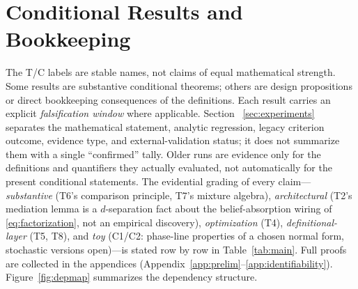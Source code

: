 \section{Conditional Results and Bookkeeping}\label{sec:theorems}

The T/C labels are stable names, not claims of equal mathematical strength.
Some results are substantive conditional theorems; others are design
propositions or direct bookkeeping consequences of the definitions. Each
result carries an explicit \emph{falsification window} where applicable. Section~
\ref{sec:experiments} separates the mathematical statement, analytic
regression, legacy criterion outcome, evidence type, and external-validation
status; it does not summarize them with a single ``confirmed'' tally. Older
runs are evidence only for the definitions and quantifiers they actually
evaluated, not automatically for the present conditional statements. The evidential grading of every claim---\emph{substantive}
(T6's comparison principle, T7's mixture algebra), \emph{architectural}
(T2's mediation lemma is a $d$-separation fact about the belief-absorption
wiring of \eqref{eq:factorization}, not an empirical discovery),
\emph{optimization} (T4), \emph{definitional-layer} (T5, T8), and
\emph{toy} (C1/C2: phase-line properties of a chosen normal form,
stochastic versions open)---is stated row by row in Table~\ref{tab:main}.
Full proofs are collected in the appendices
(Appendix~\ref{app:prelim}--\ref{app:identifiability}). Figure~\ref{fig:depmap}
summarizes the dependency structure.

